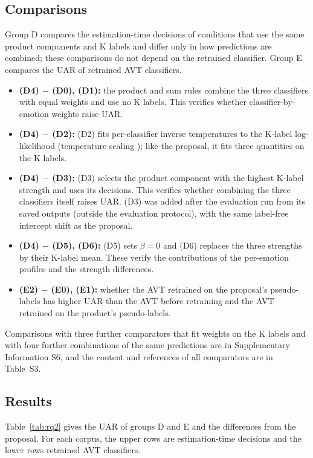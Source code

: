 \subsection{Comparisons}\label{sec:compare}
Group D compares the estimation-time decisions of conditions that use the same product components and K labels and differ only in how predictions are combined; these comparisons do not depend on the retrained classifier. Group E compares the UAR of retrained AVT classifiers.
\begin{itemize}
\item \textbf{(D4) $-$ (D0), (D1):} the product and sum rules \cite{kittler1998} combine the three classifiers with equal weights and use no K labels. This verifies whether classifier-by-emotion weights raise UAR.
\item \textbf{(D4) $-$ (D2):} (D2) fits per-classifier inverse temperatures to the K-label log-likelihood (temperature scaling \cite{guo2017calibration}); like the proposal, it fits three quantities on the K labels.
\item \textbf{(D4) $-$ (D3):} (D3) selects the product component with the highest K-label strength and uses its decisions. This verifies whether combining the three classifiers itself raises UAR. (D3) was added after the evaluation run from its saved outputs (outside the evaluation protocol), with the same label-free intercept shift as the proposal.
\item \textbf{(D4) $-$ (D5), (D6):} (D5) sets $\beta=0$ and (D6) replaces the three strengths by their K-label mean. These verify the contributions of the per-emotion profiles and the strength differences.
\item \textbf{(E2) $-$ (E0), (E1):} whether the AVT retrained on the proposal's pseudo-labels has higher UAR than the AVT before retraining and the AVT retrained on the product's pseudo-labels.
\end{itemize}
Comparisons with three further comparators that fit weights on the K labels and with four further combinations of the same predictions are in Supplementary Information S6, and the content and references of all comparators are in Table~S3.

\subsection{Results}\label{sec:rq2-results}
Table~\ref{tab:rq2} gives the UAR of groups D and E and the differences from the proposal. For each corpus, the upper rows are estimation-time decisions and the lower rows retrained AVT classifiers.

